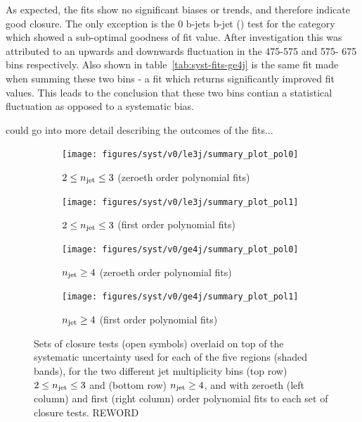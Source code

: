 As expected, the fits show no significant biases or trends, and therefore 
indicate good closure. The only exception is the 0 b-jets  b-jet (\mj) test
for the \njhigh category
which showed a sub-optimal goodness of fit value. After investigation this was 
attributed to an upwards and downwards fluctuation in the 475-575 \gev and 575-
675 \gev bins respectively. Also shown in table~\ref{tab:syst-fits-ge4j} is the 
same fit made when summing these two bins - a fit which returns significantly 
improved fit values. This leads to the conclusion that these two bins contian a 
statistical fluctuation as opposed to a systematic bias.

could go into more detail describing the outcomes of the fits...

\begin{figure}[h!]
  \centering
  \begin{subfigure}[b]{0.46\textwidth}
    \texttt{[image: figures/syst/v0/le3j/summary\_plot\_pol0]}
    \caption{$2 \leq n_{\text{jet}} \leq 3$ (zeroeth order polynomial fits)}
    \label{fig:closure_fit_le3j_pol0}
  \end{subfigure}
  \begin{subfigure}[b]{0.46\textwidth}
    \texttt{[image: figures/syst/v0/le3j/summary\_plot\_pol1]}
    \caption{$2 \leq n_{\text{jet}} \leq 3$ (first order polynomial fits)}
    \label{fig:closure_fit_le3j_pol1}
  \end{subfigure}
  \begin{subfigure}[b]{0.46\textwidth}
    \texttt{[image: figures/syst/v0/ge4j/summary\_plot\_pol0]}
    \caption{$n_{\text{jet}} \geq 4$ (zeroeth order polynomial fits)}
    \label{fig:closure_fit_ge4j_pol0}
  \end{subfigure}
  \begin{subfigure}[b]{0.46\textwidth}
    \texttt{[image: figures/syst/v0/ge4j/summary\_plot\_pol1]}
    \caption{$n_{\text{jet}} \geq 4$ (first order polynomial fits)}
    \label{fig:closure_fit_ge4j_pol1}
  \end{subfigure}
  \caption{Sets of closure tests (open symbols) overlaid on top of
      the systematic uncertainty used for each of the five \HT
      regions (shaded bands), for the two different jet multiplicity
      bins (top row) $2 \leq n_{\text{jet}} \leq 3$ and (bottom row) $n_{\text{jet}}
      \geq 4$, and with zeroeth (left column) and first (right column)
      order polynomial fits to each set of closure tests. REWORD}
  \label{fig:closure_fits}
\end{figure}


